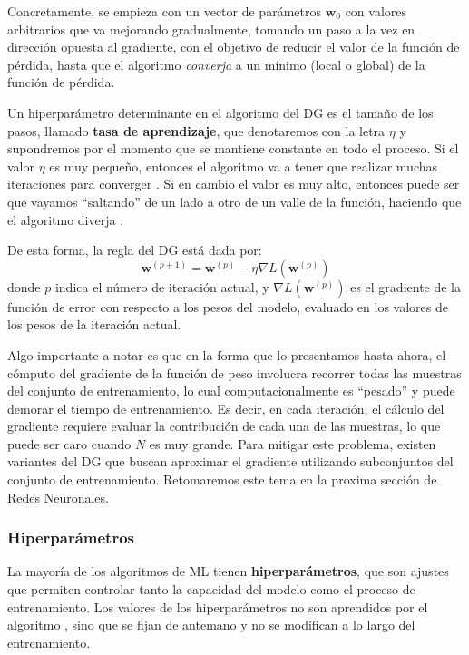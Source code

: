 \documentclass[../../main.tex]{subfiles}
\begin{document}
Concretamente, se empieza con un vector de parámetros \(\bm{w}_0\) con valores arbitrarios
que va mejorando gradualmente, tomando un paso a la vez en dirección opuesta al gradiente,
con el objetivo de reducir el valor de la función de pérdida, hasta que el algoritmo
\textit{converja} a un mínimo (local o global) de la función de pérdida.

Un hiperparámetro\footnotemark{} determinante en el algoritmo del DG es el tamaño de los
pasos, llamado \textbf{tasa de aprendizaje}, que denotaremos con la letra \(\eta\) y
supondremos por el momento que se mantiene constante en todo el proceso. Si el valor
\(\eta\) es muy pequeño, entonces el algoritmo va a tener que realizar muchas
iteraciones para converger \cite{hands-on-ML-sklearn-tf}. Si en cambio el valor es muy
alto, entonces puede ser que vayamos ``saltando'' de un lado a otro de un valle de la
función, haciendo que el algoritmo diverja \cite{hands-on-ML-sklearn-tf}.

De esta forma, la regla del DG está dada por:
\[
\bm{w}^{(p+1)} = \bm{w}^{(p)} - \eta \nabla L(\bm{w}^{(p)})
\]
donde \(p\) indica el número de iteración actual, y \(\nabla L(\bm{w}^{(p)})\) es el
gradiente de la función de error con respecto a los pesos del modelo, evaluado en los
valores de los pesos de la iteración actual.

Algo importante a notar es que en la forma que lo presentamos hasta ahora, el cómputo del
gradiente de la función de peso involucra recorrer todas las muestras del conjunto de
entrenamiento, lo cual computacionalmente es ``pesado'' y puede demorar el tiempo de
entrenamiento. Es decir, en cada iteración, el cálculo del gradiente requiere evaluar la
contribución de cada una de las muestras, lo que puede ser caro cuando \(N\) es muy
grande. Para mitigar este problema, existen variantes del DG que buscan aproximar
el gradiente utilizando subconjuntos del conjunto de entrenamiento. Retomaremos este tema
en la proxima sección de Redes Neuronales.

\subsubsection{Hiperparámetros}
La mayoría de los algoritmos de ML tienen \textbf{hiperparámetros}, que son ajustes que
permiten controlar tanto la capacidad del modelo como el proceso de entrenamiento. Los
valores de los hiperparámetros no son aprendidos por el algoritmo \cite{deep-learning},
sino que se fijan de antemano y no se modifican a lo largo del entrenamiento.
\end{document}
